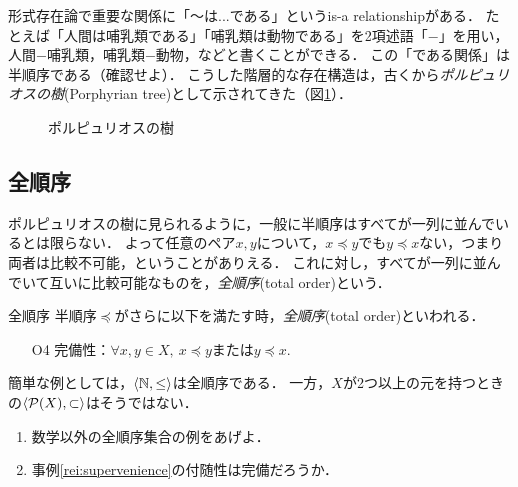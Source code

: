 \documentclass[dvipdfmx,11pt,a4paper]{jsarticle}
\begin{document}
\begin{rei}{}{}
形式存在論で重要な関係に「〜は...である」というis-a relationshipがある．
たとえば「人間は哺乳類である」「哺乳類は動物である」を2項述語「$-$」を用い，人間$-$哺乳類，哺乳類$-$動物，などと書くことができる．
この「である関係」は半順序である（確認せよ）．
こうした階層的な存在構造は，古くから\emph{ポルピュリオスの樹}(Porphyrian tree)として示されてきた（図\ref{fig:porphyrian}）．
\end{rei}
\begin{figure}[h]
\centering
{}
\caption{ポルピュリオスの樹}
\label{fig:porphyrian} 
\end{figure}


\subsection{全順序}
ポルピュリオスの樹に見られるように，一般に半順序はすべてが一列に並んでいるとは限らない．
よって任意のペア$x, y$について，$x \preceq y $でも$y \preceq x$ない，つまり両者は比較不可能，ということがありえる．
これに対し，すべてが一列に並んでいて互いに比較可能なものを，\emph{全順序}(total order)という．


\begin{dfn}{全順序}{}
半順序$\preceq$がさらに以下を満たす時，\emph{全順序}(total order)といわれる．
\begin{itemize}
 \item[O4] 完備性：$\forall x, y \in X, \ x \preceq y$または$y \preceq x$. 
\end{itemize}
\end{dfn}
%
簡単な例としては，$\langle \mathbb{N}, \leq \rangle$は全順序である．
一方，$X$が2つ以上の元を持つときの$\langle \mathcal{P}(X), \subset \rangle$はそうではない．

\begin{renshu}{}{}
\begin{enumerate}
 \item 数学以外の全順序集合の例をあげよ．
 \item 事例\ref{rei:supervenience}の付随性は完備だろうか．
\end{enumerate}
\end{renshu}
\end{document}
